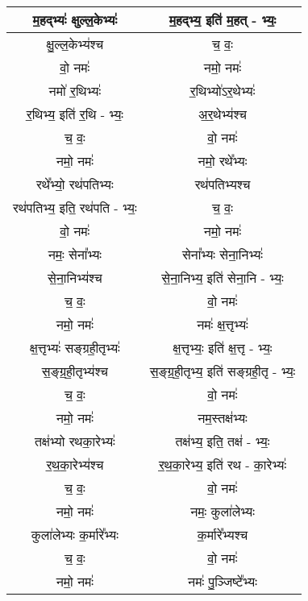 {\begin{longtable}{|c|c|}
\hline
म॒हद्भ्यः॑ क्षुल्ल॒केभ्यः॑               & म॒हद्भ्य॒ इति॑ म॒हत् - भ्यः॒\\
\hline
क्षु॒ल्ल॒केभ्य॑श्च                     & च॒ वः॒\\
\hline
वो॒ नमः॑                        & नमो॒ नमः॑\\
\hline
नमो॑ र॒थिभ्यः॑                    & र॒थिभ्यो॑ऽर॒थेभ्यः॑\\
\hline
र॒थिभ्य॒ इति॑ र॒थि - भ्यः॒           & अ॒र॒थेभ्य॑श्च\\
\hline
च॒ वः॒                          & वो॒ नमः॑\\
\hline
नमो॒ नमः॑                       & नमो॒ रथे᳚भ्यः\\
\hline
रथे᳚भ्यो॒ रथ॑पतिभ्यः                & रथ॑पतिभ्यश्च\\
\hline
रथ॑पतिभ्य॒ इति॒ रथ॑पति - भ्यः॒       & च॒ वः॒\\
\hline
वो॒ नमः॑                        & नमो॒ नमः॑\\
\hline
नमः॒ सेना᳚भ्यः                    & सेना᳚भ्यः सेना॒निभ्यः॑\\
\hline
से॒ना॒निभ्य॑श्च                     & से॒ना॒निभ्य॒ इति॑ सेना॒नि - भ्यः॒\\
\hline
च॒ वः॒                          & वो॒ नमः॑\\
\hline
नमो॒ नमः॑                       & नमः॑ क्ष॒त्तृभ्यः॑\\
\hline
क्ष॒त्तृभ्यः॑ सङ्ग्रही॒तृभ्यः॑            & क्ष॒त्तृभ्यः॒ इति॑ क्ष॒त्तृ - भ्यः॒\\
\hline
स॒ङ्ग्र॒ही॒तृभ्य॑श्च                   & स॒ङ्ग्र॒ही॒तृभ्य॒ इति॑ सङ्ग्रही॒तृ - भ्यः॒\\
\hline
च॒ वः॒                          & वो॒ नमः॑\\
\hline
नमो॒ नमः॑                       & नम॒स्तक्ष॑भ्यः\\
\hline
तक्ष॑भ्यो रथका॒रेभ्यः॑               & तक्ष॑भ्य॒ इति॒ तक्ष॑ - भ्यः॒\\
\hline
र॒थ॒का॒रेभ्य॑श्च                     & र॒थ॒का॒रेभ्य॒ इति॑ रथ - का॒रेभ्यः॑\\
\hline
च॒ वः॒                          & वो॒ नमः॑\\
\hline
नमो॒ नमः॑                       & नमः॒ कुला॑लेभ्यः\\
\hline
कुला॑लेभ्यः क॒र्मारे᳚भ्यः              & क॒र्मारे᳚भ्यश्च\\
\hline
च॒ वः॒                          & वो॒ नमः॑\\
\hline
नमो॒ नमः॑                       & नमः॑ पु॒ञ्जिष्टे᳚भ्यः\\

\end{longtable}}
